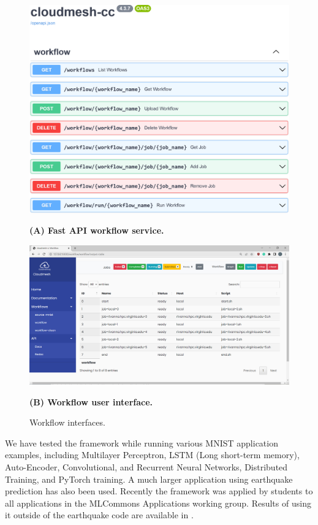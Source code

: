 \documentclass[utf8]{FrontiersinVancouver} %
\begin{document}
\begin{figure}[htb]
  \centering\includegraphics[width=0.8\columnwidth]{images/fastapi-service-highres.jpg}
  
  {\bf (A) Fast API workflow service.}

  \bigskip


    \centering\includegraphics[width=0.8\columnwidth]{images/cc-1.jpg}

    {\bf (B) Workflow user interface.}

    \caption{Workflow interfaces.}
    \label{fig:cc-3}
\end{figure}


We have tested the framework while running various MNIST application examples, including Multilayer Perceptron, LSTM (Long short-term memory), Auto-Encoder, Convolutional, and Recurrent Neural Networks, Distributed Training, and PyTorch training.  A much larger application using earthquake prediction has also been used.
Recently the framework was applied by students to all applications in the MLCommons Applications working group. Results of using it outside of the earthquake code are available in \cite{las-2023-escience}.
\end{document}
